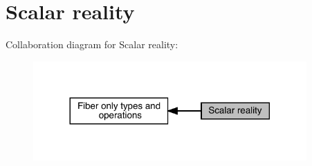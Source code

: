 \hypertarget{group__rscalar}{}\section{Scalar reality}
\label{group__rscalar}
Collaboration diagram for Scalar reality\+:\nopagebreak
\begin{figure}[H]
\begin{center}
\leavevmode
\includegraphics[width=296pt]{d9/ded/group__rscalar}
\end{center}
\end{figure}
